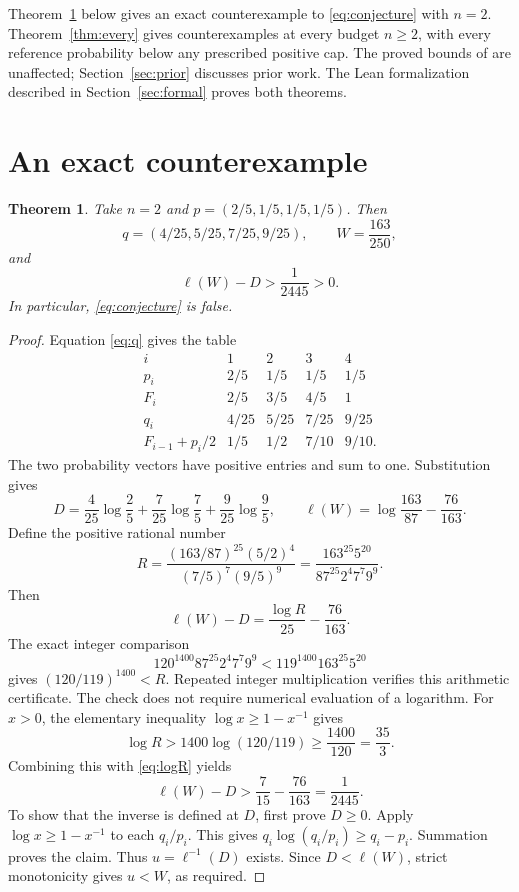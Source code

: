 \documentclass[11pt,a4paper]{article}
\newtheorem{theorem}{Theorem}
\begin{document}
Theorem~\ref{thm:finite} below gives an exact counterexample to \eqref{eq:conjecture} with $n=2$. Theorem~\ref{thm:every} gives counterexamples at every budget $n\geq2$, with every reference probability below any prescribed positive cap. The proved bounds of \cite{beirami} are unaffected; Section~\ref{sec:prior} discusses prior work. The Lean formalization described in Section~\ref{sec:formal} proves both theorems.

\section{An exact counterexample}
\begin{theorem}\label{thm:finite}
Take $n=2$ and $p=(2/5,1/5,1/5,1/5)$. Then
\[
 q=(4/25,5/25,7/25,9/25),\qquad W=\frac{163}{250},
\]
and
\begin{equation}\label{eq:gap}
 \ell(W)-D>\frac1{2445}>0.
\end{equation}
In particular, \eqref{eq:conjecture} is false.
\end{theorem}
\begin{proof}
Equation \eqref{eq:q} gives the table
\[
\begin{array}{c|cccc}
 i&1&2&3&4\\\hline
 p_i&2/5&1/5&1/5&1/5\\
 F_i&2/5&3/5&4/5&1\\
 q_i&4/25&5/25&7/25&9/25\\
 F_{i-1}+p_i/2&1/5&1/2&7/10&9/10.
\end{array}
\]
The two probability vectors have positive entries and sum to one. Substitution gives
\[
 D=\frac4{25}\log\frac25+\frac7{25}\log\frac75+\frac9{25}\log\frac95,
 \qquad \ell(W)=\log\frac{163}{87}-\frac{76}{163}.
\]
Define the positive rational number
\[
 R=\frac{(163/87)^{25}(5/2)^4}{(7/5)^7(9/5)^9}
   =\frac{163^{25}5^{20}}{87^{25}2^4 7^7 9^9}.
\]
Then
\begin{equation}\label{eq:logR}
 \ell(W)-D=\frac{\log R}{25}-\frac{76}{163}.
\end{equation}
The exact integer comparison
\begin{equation}\label{eq:integer}
 120^{1400}87^{25}2^4 7^7 9^9
 <119^{1400}163^{25}5^{20}
\end{equation}
gives $(120/119)^{1400}<R$. Repeated integer multiplication verifies this arithmetic certificate. The check does not require numerical evaluation of a logarithm.
For $x>0$, the elementary inequality $\log x\geq1-x^{-1}$ gives
\[
 \log R>1400\log(120/119)\geq\frac{1400}{120}=\frac{35}{3}.
\]
Combining this with \eqref{eq:logR} yields
\[
 \ell(W)-D>\frac7{15}-\frac{76}{163}=\frac1{2445}.
\]
To show that the inverse is defined at $D$, first prove $D\geq0$. Apply $\log x\geq1-x^{-1}$ to each $q_i/p_i$. This gives $q_i\log(q_i/p_i)\geq q_i-p_i$. Summation proves the claim. Thus $u=\ell^{-1}(D)$ exists. Since $D<\ell(W)$, strict monotonicity gives $u<W$, as required.
\end{proof}
\end{document}
